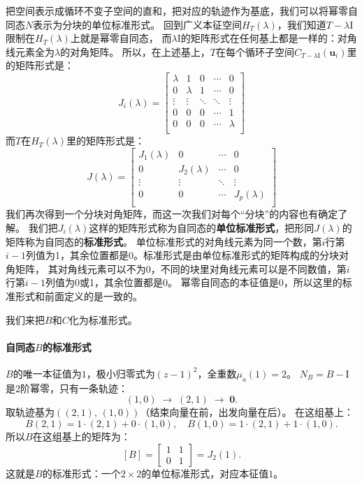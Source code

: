\documentclass[12pt,UTF8]{ctexbook}
\begin{document}
把空间表示成循环不变子空间的直和，把对应的轨迹作为基底，我们可以将幂零自同态$N$表示为分块的单位标准形式。
回到广义本征空间$H_T(\lambda)$，我们知道$T-\lambda \mathrm{I}$限制在$H_T(\lambda)$上就是幂零自同态，
而$\lambda \mathrm{I}$的矩阵形式在任何基上都是一样的：对角线元素全为$\lambda$的对角矩阵。
所以，在上述基上，$T$在每个循环子空间$C_{T-\lambda \mathrm{I}}(\mathbf{u}_i)$里的矩阵形式是：
$$
J_i(\lambda) = \begin{bmatrix}
     \lambda & 1 & 0 & \cdots & 0 \\
     0 & \lambda & 1 & \cdots & 0 \\
     \vdots & \vdots & \ddots & \ddots & \vdots  \\
     0 & 0 & 0 & \cdots  & 1  \\
     0 & 0 & 0 & \cdots & \lambda \\
    \end{bmatrix}
$$
而$T$在$H_T(\lambda)$里的矩阵形式是：
$$
J(\lambda) = \begin{bmatrix}
     J_1(\lambda) & 0 & \cdots & 0 \\
     0 & J_2(\lambda) & \cdots & 0 \\
     \vdots & \vdots & \ddots  & \vdots  \\
     0 & 0 & \cdots  & J_p(\lambda)  \\
    \end{bmatrix}
$$
我们再次得到一个分块对角矩阵，而这一次我们对每个“分块”的内容也有确定了解。
我们把$J_i(\lambda)$这样的矩阵形式称为自同态的\textbf{单位标准形式}，把形同$J(\lambda)$的矩阵称为自同态的\textbf{标准形式}。
单位标准形式的对角线元素为同一个数，第$i$行第$i-1$列值为1，其余位置都是0。标准形式是由单位标准形式的矩阵构成的分块对角矩阵，
其对角线元素可以不为0，不同的块里对角线元素可以是不同数值，第$i$行第$i-1$列值为0或1，其余位置都是0。
幂零自同态的本征值是0，所以这里的标准形式和前面定义的是一致的。

我们来把$B$和$C$化为标准形式。

\paragraph{自同态$B$的标准形式}

$B$的唯一本征值为$1$，极小归零式为$(z-1)^2$，全重数$\mu_a(1) = 2$。
$N_B = B - \mathrm{I}$是$2$阶幂零，只有一条轨迹：
$$
(1,0) \;\longrightarrow\; (2,1) \;\longrightarrow\; \mathbf{0}.
$$
取轨迹基为$((2,1),\, (1,0))$（结束向量在前，出发向量在后）。
在这组基上：
$$
B(2,1) = 1\cdot(2,1) + 0\cdot(1,0), \quad B(1,0) = 1\cdot(2,1) + 1\cdot(1,0).
$$
所以$B$在这组基上的矩阵为：
$$
[B] = \begin{bmatrix} 1 & 1 \\ 0 & 1 \end{bmatrix} = J_2(1).
$$
这就是$B$的标准形式：一个$2\times 2$的单位标准形式，对应本征值$1$。
\end{document}

